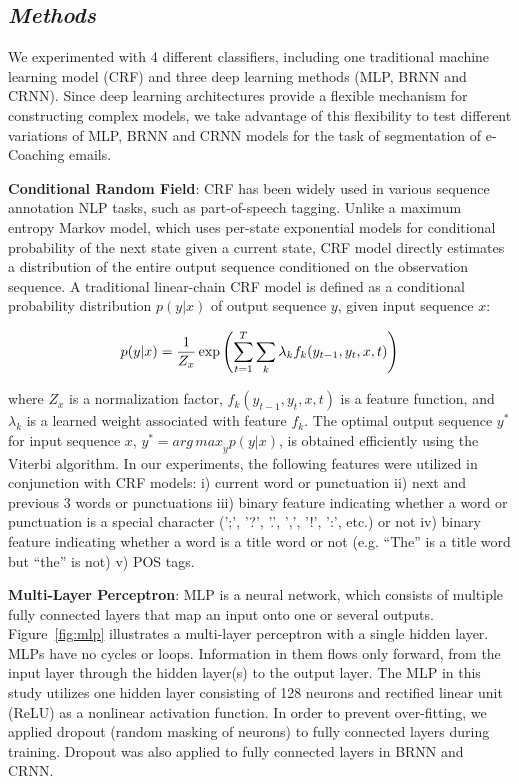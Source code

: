 \documentclass{amia}
\begin{document}
\subsection*{\textit{Methods}}

We experimented with 4 different classifiers, including one traditional machine learning model (CRF) and three deep learning methods (MLP, BRNN and CRNN). Since deep learning architectures provide a flexible mechanism for constructing complex models, we take advantage of this flexibility to test different variations of MLP, BRNN and CRNN models for the task of segmentation of e-Coaching emails.

\textbf{Conditional Random Field}: CRF has been widely used in various sequence annotation NLP tasks, such as part-of-speech tagging.\cite{lafferty2001conditional, hirohata2008identifying} Unlike a maximum entropy Markov model, which uses per-state exponential models for conditional probability of the next state given a current state, CRF model directly estimates a distribution of the entire output sequence conditioned on the observation sequence. A traditional linear-chain CRF model is defined as a conditional probability distribution $p(y|x)$ of output sequence $y$, given input sequence $x$:

\begin{equation}
\label{Eq:crf}
p(y|x) = \frac{1}{Z_x}\exp{\left(\sum_{t=1}^{T}\sum_{k}^{}\lambda_k f_k(y_{t-1}, y_t, x, t)\right)} \\
\end{equation}

where $Z_x$ is a normalization factor, $f_k(y_{t-1}, y_t, x, t)$ is a feature function, and $\lambda_k$ is a learned weight associated with feature $f_k$. The optimal output sequence $y^*$ for input sequence $x$, $y^* = {arg\,max}_y p(y|x)$, is obtained efficiently using the Viterbi algorithm. In our experiments, the following features were utilized in conjunction with CRF models: i) current word or punctuation ii) next and previous 3 words or punctuations iii) binary feature indicating whether a word or punctuation is a special character (';', '?', '.', ',', '!', ':', etc.) or not iv) binary feature indicating whether a word is a title word or not (e.g. ``The'' is a title word but ``the'' is not) v) POS tags.   

\textbf{Multi-Layer Perceptron}: MLP is a neural network, which consists of multiple fully connected layers that map an input onto one or several outputs.\cite{rumelhart1986learning} Figure~\ref{fig:mlp} illustrates a multi-layer perceptron with a single hidden layer. MLPs have no cycles or loops. Information in them flows only forward, from the input layer through the hidden layer(s) to the output layer. The MLP in this study utilizes one hidden layer consisting of 128 neurons and rectified linear unit (ReLU) as a nonlinear activation function. In order to prevent over-fitting, we applied dropout (random masking of neurons) \cite{srivastava2014dropout} to fully connected layers during training. Dropout was also applied to fully connected layers in BRNN and CRNN. 
\end{document}
